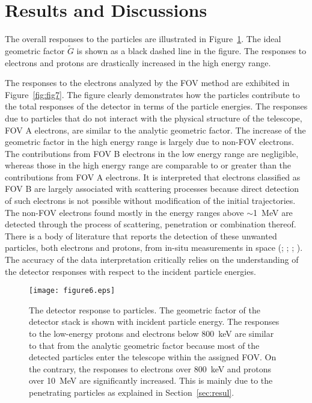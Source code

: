 \documentclass{jkas}
\begin{document}
\section{Results and Discussions\label{sec:resul}}

The overall responses to the particles are illustrated in Figure~\ref{fig:fig6}. The ideal geometric factor $\tilde{G}$ is shown as a black dashed line in the figure. The responses to electrons and protons are drastically increased in the high energy range.

The responses to the electrons analyzed by the FOV method are exhibited in Figure~\ref{fig:fig7}. The figure clearly demonstrates how the particles contribute to the total responses of the detector in terms of the particle energies. The responses due to particles that do not interact with the physical structure of the telescope, FOV A electrons, are similar to the analytic geometric factor. The increase of the geometric factor in the high energy range is largely due to non-FOV electrons. The contributions from FOV B electrons in the low energy range are negligible, whereas those in the high energy range are comparable to or greater than the contributions from FOV A electrons. It is interpreted that electrons classified as FOV B are largely associated with scattering processes because direct detection of such electrons is not possible without modification of the initial trajectories. The non-FOV electrons found mostly in the energy ranges above $\sim$1~MeV are detected through the process of scattering, penetration or combination thereof. There is a body of literature that reports the detection of these unwanted particles, both electrons and protons, from in-situ measurements in space (\citealt{rodger2010}; \citealt{ni2011}; \citealt{turner2012}; \citealt{asikainen2013}). The accuracy of the data interpretation critically relies on the understanding of the detector responses with respect to the incident particle energies.


\begin{figure}[t!]
\centering
\texttt{[image: figure6.eps]}
\caption{The detector response to particles. The geometric factor of the detector stack is shown with incident particle energy. The responses to the low-energy protons and electrons below 800~keV are similar to that from the analytic geometric factor because most of the detected particles enter the telescope within the assigned FOV. On the contrary, the responses to electrons over 800~keV and protons over 10~MeV are significantly increased. This is mainly due to the penetrating particles as explained in Section~\ref{sec:resul}.\label{fig:fig6}}
\end{figure}
\end{document}

